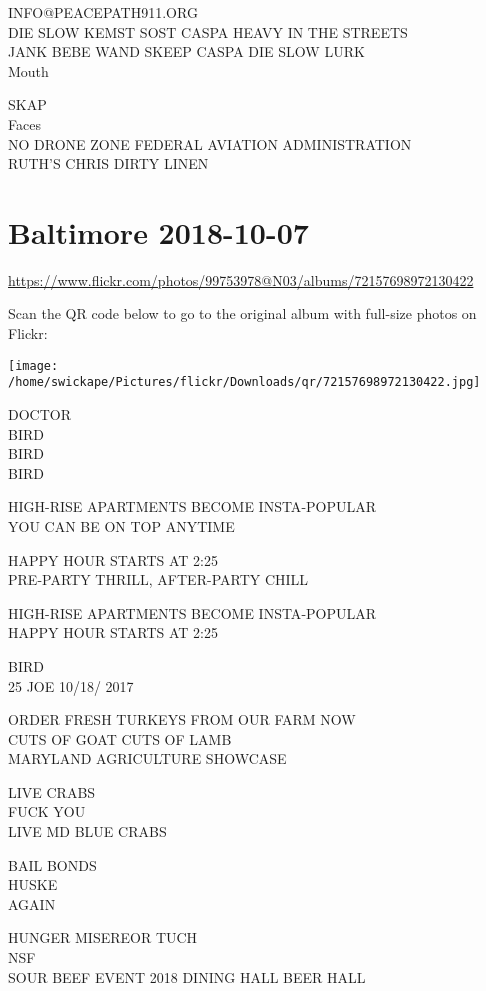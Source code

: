 \documentclass[10pt,letterpaper]{article}
\begin{document}
INFO@PEACEPATH911.ORG\\
DIE SLOW KEMST SOST CASPA HEAVY IN THE STREETS\\
JANK BEBE WAND SKEEP CASPA DIE SLOW LURK\\
Mouth

SKAP\\
Faces\\
NO DRONE ZONE FEDERAL AVIATION ADMINISTRATION\\
RUTH'S CHRIS DIRTY LINEN
\pagebreak

\section*{Baltimore 2018-10-07}

\url{https://www.flickr.com/photos/99753978@N03/albums/72157698972130422}

Scan the QR code below to go to the original album with full-size photos on Flickr:

\texttt{[image: /home/swickape/Pictures/flickr/Downloads/qr/72157698972130422.jpg]}
\pagebreak

DOCTOR\\
BIRD\\
BIRD\\
BIRD

HIGH{-}RISE APARTMENTS BECOME INSTA{-}POPULAR\\
YOU CAN BE ON TOP ANYTIME

HAPPY HOUR STARTS AT 2:25\\
PRE{-}PARTY THRILL, AFTER{-}PARTY CHILL

HIGH{-}RISE APARTMENTS BECOME INSTA{-}POPULAR\\
HAPPY HOUR STARTS AT 2:25

BIRD\\
25 JOE 10/18/ 2017

ORDER FRESH TURKEYS FROM OUR FARM NOW\\
CUTS OF GOAT CUTS OF LAMB\\
MARYLAND AGRICULTURE SHOWCASE

LIVE CRABS\\
FUCK YOU\\
LIVE MD BLUE CRABS

BAIL BONDS\\
HUSKE\\
AGAIN

HUNGER MISEREOR TUCH\\
NSF\\
SOUR BEEF EVENT 2018 DINING HALL BEER HALL
\end{document}
